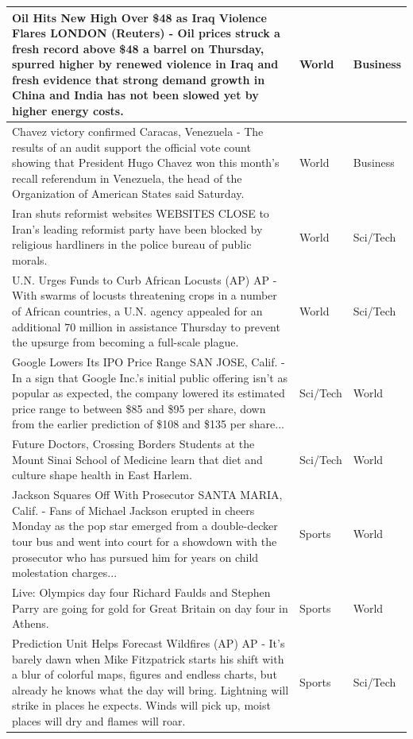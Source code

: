\documentclass[12pt,a4paper,english]{article}
\begin{document}
\begin{longtable}{| m{25em} | m{5em} | m{5em} |}
Oil Hits New High Over \$48 as Iraq Violence Flares LONDON (Reuters) - Oil prices struck a fresh record above \$48 a barrel on Thursday, spurred higher by renewed violence in Iraq and fresh evidence that strong demand growth in China and India has not been slowed yet by higher energy costs. & World & Business \\ \hline
Chavez victory confirmed Caracas, Venezuela - The results of an audit support the official vote count showing that President Hugo Chavez won this month's recall referendum in Venezuela, the head of the Organization of American States said Saturday. & World & Business \\ \hline
Iran shuts reformist websites WEBSITES CLOSE to Iran's leading reformist party have been blocked by religious hardliners in the police bureau of public morals. & World & Sci/Tech \\ \hline
U.N. Urges Funds to Curb African Locusts (AP) AP - With swarms of locusts threatening crops in a number of African countries, a U.N. agency appealed for an additional 70 million in assistance Thursday to prevent the upsurge from becoming a full-scale plague. & World & Sci/Tech \\ \hline
Google Lowers Its IPO Price Range SAN JOSE, Calif. - In a sign that Google Inc.'s initial public offering isn't as popular as expected, the company lowered its estimated price range to between \$85 and \$95 per share, down from the earlier prediction of \$108 and \$135 per share... & Sci/Tech & World \\ \hline
Future Doctors, Crossing Borders Students at the Mount Sinai School of Medicine learn that diet and culture shape health in East Harlem. & Sci/Tech & World \\ \hline
Jackson Squares Off With Prosecutor SANTA MARIA, Calif. - Fans of Michael Jackson erupted in cheers Monday as the pop star emerged from a double-decker tour bus and went into court for a showdown with the prosecutor who has pursued him for years on child molestation charges... & Sports & World \\ \hline
Live: Olympics day four Richard Faulds and Stephen Parry are going for gold for Great Britain on day four in Athens. & Sports & World \\ \hline
Prediction Unit Helps Forecast Wildfires (AP) AP - It's barely dawn when Mike Fitzpatrick starts his shift with a blur of colorful maps, figures and endless charts, but already he knows what the day will bring. Lightning will strike in places he expects. Winds will pick up, moist places will dry and flames will roar. & Sports & Sci/Tech \\ \hline

\end{longtable}
\end{document}
